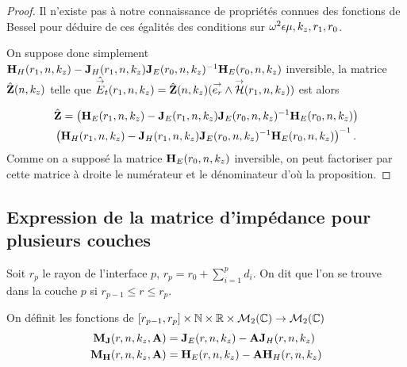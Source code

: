 \begin{proof}
      Il n'existe pas à notre connaissance de propriétés connues des fonctions de Bessel pour déduire de ces égalités des conditions sur \(\omega^2\eps\mu,k_z,r_1,r_0\).

      On suppose donc simplement \(\mH_{H}(r_1,n,k_z) - \mJ_{H}(r_1,n,k_z)\mJ_{E}(r_0,n,k_z)^{-1}\mH_{E}(r_0,n,k_z)\) inversible, la matrice \(\hat\mZ(n,k_z)\) telle que \(\hat\vE_t(r_1,n,k_z) = \hat\mZ(n,k_z) (\vect{e_r}\pvect\vH(r_1,n,k_z))\) est alors

      \begin{multline*}
        \hat \mZ =
        \left(\mH_{E}(r_1,n,k_z) - \mJ_{E}(r_1,n,k_z)\mJ_{E}(r_0,n,k_z)^{-1}\mH_{E}(r_0,n,k_z)\right)
        \\
        \left(\mH_{H}(r_1,n,k_z) - \mJ_{H}(r_1,n,k_z)\mJ_{E}(r_0,n,k_z)^{-1}\mH_{E}(r_0,n,k_z)\right)^{-1}.
      \end{multline*}
      Comme on a supposé la matrice \(\mH_E(r_0,n,k_z)\) inversible, on peut factoriser par cette matrice à droite le numérateur et le dénominateur d'où la proposition.

    \end{proof}


  \subsection{Expression de la matrice d'impédance pour plusieurs couches}

    \begin{figure}[!hbt]
      \centering
      \begin{tikzpicture}
        
      \end{tikzpicture}
    \end{figure}

    Soit \(r_p\) le rayon de l'interface \(p\), \(r_p = r_0 +\sum_{i=1}^{p} d_{i}\). On dit que l'on se trouve dans la couche \(p\) si \(r_{p-1} \le r \le r_p \).

    \begin{defn}
      On définit les fonctions de \([r_{p-1}, r_p]\times \NN \times \RR \times \mathcal{M}_{2}(\CC) \rightarrow \mathcal{M}_{2}(\CC)\)
      \begin{align*}
        \mM_{\mJ}(r,n,k_z,\mA) &= \mJ_{E}(r,n,k_z) -  \mA \mJ_{H}(r,n,k_z)
        \\
        \mM_{\mH}(r,n,k_z,\mA) &= \mH_{E}(r,n,k_z) -  \mA \mH_{H}(r,n,k_z)
      \end{align*}
    \end{defn}


